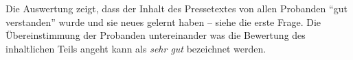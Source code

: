 Die Auswertung zeigt, dass der Inhalt des Pressetextes von allen Probanden
\enquote{gut verstanden} wurde und sie neues gelernt haben -- siehe die erste Frage. 
Die Übereinstimmung der Probanden untereinander was die Bewertung des inhaltlichen 
Teils angeht kann als \emph{sehr gut} bezeichnet werden.








